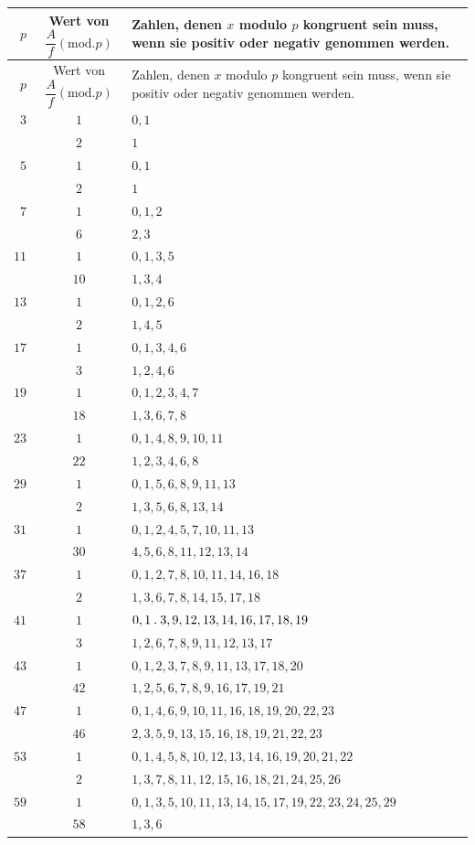 \clearpage{}
\begingroup\fontsize{9.5}{12}\selectfont\setlength{\tabcolsep}{4pt}\renewcommand{\arraystretch}{1.10}
\begin{longtable}{r|c|p{262pt}}
\hline
$p$ & \shortstack{Wert von\\$\dfrac{A}{f}(\mathrm{mod}.p)$} & Zahlen, denen $x$ modulo $p$ kongruent sein muss, wenn sie positiv oder negativ genommen werden.\\\hline
\endfirsthead
$p$ & \shortstack{Wert von\\$\dfrac{A}{f}(\mathrm{mod}.p)$} & Zahlen, denen $x$ modulo $p$ kongruent sein muss, wenn sie positiv oder negativ genommen werden.\\\hline
\endhead
$3$ & $1$ & $0,1$\\
 & $2$ & $1$\\
$5$ & $1$ & $0,1$\\
 & $2$ & $1$\\
$7$ & $1$ & $0,1,2$\\
 & $6$ & $2,3$\\
$11$ & $1$ & $0,1,3,5$\\
 & $10$ & $1,3,4$\\
$13$ & $1$ & $0,1,2,6$\\
 & $2$ & $1,4,5$\\
$17$ & $1$ & $0,1,3,4,6$\\
 & $3$ & $1,2,4,6$\\
$19$ & $1$ & $0,1,2,3,4,7$\\
 & $18$ & $1,3,6,7,8$\\
$23$ & $1$ & $0,1,4,8,9,10,11$\\
 & $22$ & $1,2,3,4,6,8$\\
$29$ & $1$ & $0,1,5,6,8,9,11,13$\\
 & $2$ & $1,3,5,6,8,13,14$\\
$31$ & $1$ & $0,1,2,4,5,7,10,11,13$\\
 & $30$ & $4,5,6,8,11,12,13,14$\\
$37$ & $1$ & $0,1,2,7,8,10,11,14,16,18$\\
 & $2$ & $1,3,6,7,8,14,15,17,18$\\
$41$ & $1$ & $0,1\mathbin{.} 3,9,12,13,14,16,17,18,19$\\
 & $3$ & $1,2,6,7,8,9,11,12,13,17$\\
$43$ & $1$ & $0,1,2,3,7,8,9,11,13,17,18,20$\\
 & $42$ & $1,2,5,6,7,8,9,16,17,19,21$\\
$47$ & $1$ & $0,1,4,6,9,10,11,16,18,19,20,22,23$\\
 & $46$ & $2,3,5,9,13,15,16,18,19,21,22,23$\\
$53$ & $1$ & $0,1,4,5,8,10,12,13,14,16,19,20,21,22$\\
 & $2$ & $1,3,7,8,11,12,15,16,18,21,24,25,26$\\
$59$ & $1$ & $0,1,3,5,10,11,13,14,15,17,19,22,23,24,25,29$\\
 & $58$ & $1,3,6$\\
\end{longtable}\endgroup
